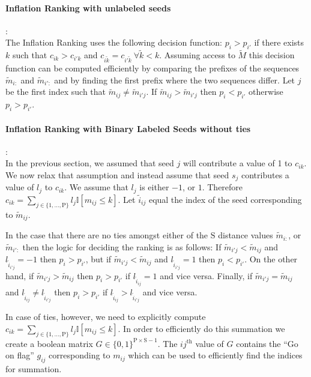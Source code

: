 \documentclass[14pt]{article}
\renewcommand{\th}[1]{$#1^{\textrm{th}}$}
\newcommand{\tk}[0]{\tilde{k}}
\newcommand{\tM}[0]{\tilde{M}}
\newcommand{\tm}[0]{\tilde{m}}
\newcommand{\rmP}[0]{\mathrm{P}}
\newcommand{\rmS}[0]{\mathrm{S}}
\newcommand{\ti}[0]{\tilde{i}}
\begin{document}
\paragraph{Inflation Ranking with unlabeled seeds}:\\
The Inflation Ranking uses the following decision function:
$p_{i} > p_{i'}$ if there exists $k$ such that $c_{ik} > c_{i'k}$ and
$c_{i\tk} = c_{i'\tk}\ \forall \tk < k$. Assuming access to $\tM$ this
decision function can be computed efficiently by comparing the prefixes of
the sequences $\tm_{i:}$ and $\tm_{i':}$ and by finding the first prefix where
the two sequences differ. Let $j$ be the first index such
that $\tm_{ij} \ne \tm_{i'j}$. If $\tm_{ij} > \tm_{i'j}$ then $p_{i} < p_{i'}$
otherwise $p_i > p_{i'}$.


\paragraph{Inflation Ranking with Binary Labeled Seeds without ties}:\\
In the previous section, we assumed that seed $j$ will contribute a value of 1 to
$c_{ik}$. We now relax that assumption and instead assume that seed $s_j$
contributes a value of $l_j$ to $c_{ik}$. We assume that $l_j$ is either $-1$,
or $1$. Therefore $c_{ik} = \sum_{j \in \{1, \ldots, \rmP\}}l_j\mathbb{I}[m_{ij} \le k]$.
Let $\ti_{ij}$ equal the index of the seed corresponding to $\tm_{ij}$.

In the case that there are
no ties amongst either of the $\rmS$ distance values $\tm_{i:}$, or $\tm_{i':}$
then the logic for deciding the ranking is as follows:
If $\tm_{i'j} < \tm_{ij}$ and $l_{\ti_{i'j}} = -1$ then $p_i > p_{i'}$, but
if $\tm_{i'j} < \tm_{ij}$ and $l_{\ti_{i'j}} = 1$ then $p_i < p_{i'}$.
On the other hand, if $\tm_{i'j} > \tm_{ij}$ then $p_i > p_{i'}$ if $l_{\ti_{ij}} = 1$ and vice versa. Finally, if $\tm_{i'j} = \tm_{ij}$ and $l_{\ti_{ij}} \ne l_{\ti_{i'j}}$ then
$p_i > p_{i'}$ if $l_{\ti_{ij}} > l_{\ti_{i'j}}$ and vice versa.

In case of ties, however, we need to explicitly compute
$c_{ik} = \sum_{j \in \{1, \ldots, \rmP\}}l_j\mathbb{I}[m_{ij} \le k]$.
In order to efficiently do this summation we create a boolean matrix $G \in \{0, 1\}^{\rmP \times \mathrm{S-1}}$. The \th{ij} value of $G$
contains the ``Go on flag'' $g_{ij}$ corresponding to $m_{ij}$ which can be used to
efficiently find the indices for summation.
\end{document}
